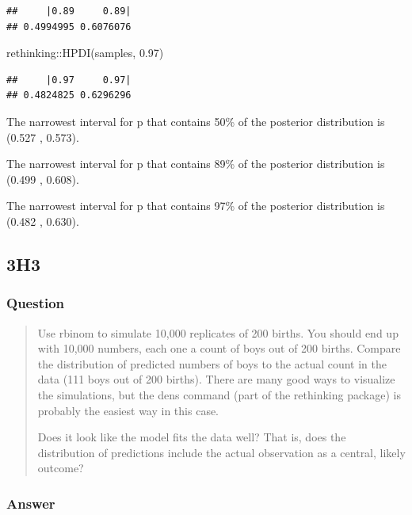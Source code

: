 \documentclass[
]{book}
\newenvironment{Shaded}{\begin{snugshade}}{\end{snugshade}}
\newcommand{\FloatTok}[1]{\textcolor[rgb]{0.00,0.00,0.81}{#1}}
\newcommand{\FunctionTok}[1]{\textcolor[rgb]{0.00,0.00,0.00}{#1}}
\newcommand{\NormalTok}[1]{#1}
\newcommand{\SpecialCharTok}[1]{\textcolor[rgb]{0.00,0.00,0.00}{#1}}
\begin{document}
\begin{verbatim}
##     |0.89     0.89| 
## 0.4994995 0.6076076
\end{verbatim}

\begin{Shaded}
\begin{Highlighting}[]
\NormalTok{rethinking}\SpecialCharTok{::}\FunctionTok{HPDI}\NormalTok{(samples, }\FloatTok{0.97}\NormalTok{)}
\end{Highlighting}
\end{Shaded}

\begin{verbatim}
##     |0.97     0.97| 
## 0.4824825 0.6296296
\end{verbatim}

The narrowest interval for p that contains 50\% of the posterior distribution is (0.527 , 0.573).

The narrowest interval for p that contains 89\% of the posterior distribution is (0.499 , 0.608).

The narrowest interval for p that contains 97\% of the posterior distribution is (0.482 , 0.630).

\hypertarget{h3-1}{%
\subsection*{3H3}\label{h3-1}}

\hypertarget{question-30}{%
\subsubsection*{Question}\label{question-30}}

\begin{quote}
Use rbinom to simulate 10,000 replicates of 200 births. You should end up with 10,000 numbers, each one a count of boys out of 200 births. Compare the distribution of predicted numbers of boys to the actual count in the data (111 boys out of 200 births). There are many good ways to visualize the simulations, but the dens command (part of the rethinking package) is probably the easiest way in this case.

Does it look like the model fits the data well? That is, does the distribution of predictions include the actual observation as a central, likely outcome?
\end{quote}

\hypertarget{answer-30}{%
\subsubsection*{Answer}\label{answer-30}}
\end{document}
